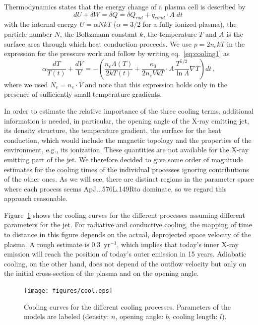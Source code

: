 Thermodynamics states that the energy change of a plasma cell is described by
\begin{equation}
dU + \delta W = \delta Q = \delta Q_{rad} + q_{cond}\cdot A\;dt\; \label{eq:cooling1}
\end{equation}
with the internal energy $U=\alpha N kT$ ($\alpha=3/2$ for a fully ionized plasma), the particle number $N$, the Boltzmann constant $k$, the temperature $T$  and $A$ is the surface area through which heat conduction proceeds.
We use $p=2n_ekT$ in the expression for the pressure work and follow \citet{Guedel_2008} by writing  eq.~\ref{eq:cooling1} as
\begin{equation}
\alpha \frac{dT}{T(t)} + \frac{dV}{V} = - \left( \frac{n_e \Lambda(T)}{2 k T(t)}+ \frac{\kappa_0}{2n_eVkT}\cdot A\frac{T^{5/2}}{\ln \Lambda} \nabla T \right) dt \,,\label{eq:cool}
\end{equation}
where we used $N_e=n_e\cdot V$ and note that this expression holds only in the presence of sufficiently small temperature gradients.


In order to estimate the relative importance of the three cooling terms, additional information is needed, in particular, the opening angle of the X-ray emitting jet, its density structure, the temperature gradient, the surface for the heat conduction, which would include the magnetic topology and the properties of the environment, e.g., its ionization. These quantities are not available for the X-ray emitting part of the jet. We therefore decided to give some order of magnitude estimates for the cooling times of the individual processes ignoring contributions of the other ones. As we will see, there are distinct regions in the parameter space where each process seems ApJ...576L.149Rto dominate, so we regard this approach reasonable.

Figure~\ref{fig:cooling} shows the cooling curves for the different processes assuming different parameters for the jet. For radiative and conductive cooling, the mapping of time to distance in this figure depends on the actual, deprojected space velocity of the plasma. 
A rough estimate is 0.3\arcsec{}~yr$^{-1}$, which implies that today's inner X-ray emission will reach the position of today's outer emission in 15 years.
Adiabatic cooling, on the other hand, does not depend of the outflow velocity but only on the initial cross-section of the plasma and on the opening angle.


\begin{figure}
  \centering
   \texttt{[image: figures/cool.eps]}
   \caption{Cooling curves for the different cooling processes. Parameters of the models are labeled (density: $n$, opening angle: $b$, cooling length: $l$). \label{fig:cooling}}
\end{figure}


